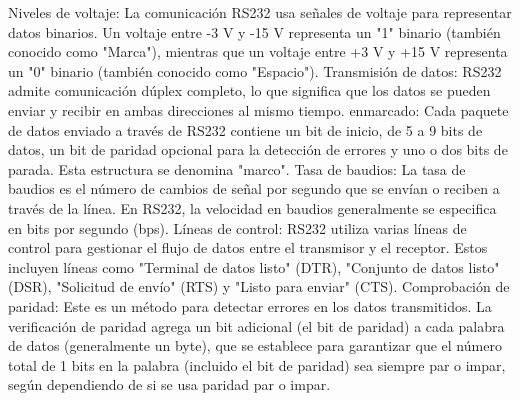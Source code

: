 Niveles de voltaje: La comunicación RS232 usa señales de voltaje para representar datos binarios. Un voltaje entre -3 V y -15 V representa un "1" binario (también conocido como "Marca"), mientras que un voltaje entre +3 V y +15 V representa un "0" binario (también conocido como "Espacio").
Transmisión de datos: RS232 admite comunicación dúplex completo, lo que significa que los datos se pueden enviar y recibir en ambas direcciones al mismo tiempo.
enmarcado: Cada paquete de datos enviado a través de RS232 contiene un bit de inicio, de 5 a 9 bits de datos, un bit de paridad opcional para la detección de errores y uno o dos bits de parada. Esta estructura se denomina "marco".
Tasa de baudios: La tasa de baudios es el número de cambios de señal por segundo que se envían o reciben a través de la línea. En RS232, la velocidad en baudios generalmente se especifica en bits por segundo (bps).
Líneas de control: RS232 utiliza varias líneas de control para gestionar el flujo de datos entre el transmisor y el receptor. Estos incluyen líneas como "Terminal de datos listo" (DTR), "Conjunto de datos listo" (DSR), "Solicitud de envío" (RTS) y "Listo para enviar" (CTS).
Comprobación de paridad: Este es un método para detectar errores en los datos transmitidos. La verificación de paridad agrega un bit adicional (el bit de paridad) a cada palabra de datos (generalmente un byte), que se establece para garantizar que el número total de 1 bits en la palabra (incluido el bit de paridad) sea siempre par o impar, según dependiendo de si se usa paridad par o impar.

